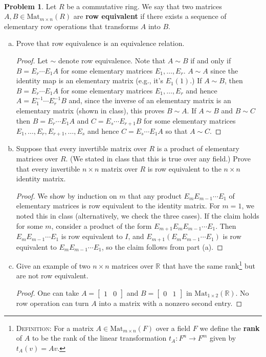 \documentclass[11pt]{article}
\theoremstyle{definition}
\newtheorem{problem}{Problem}
\begin{document}
\

\begin{problem}
Let $R$ be a commutative ring. We say that two matrices $A,B\in \mathrm{Mat}_{m\times n}(R)$ are \textbf{row equivalent} if there exists a sequence of elementary row operations that transforms $A$ into $B$. 
\begin{enumerate}[(a)]
\item Prove that row equivalence is an equivalence relation.
  \begin{proof} Let $\sim$ denote row equivalence. Note that $A \sim B$ if and only if $B = E_r \cdots E_1 A$ for some elementary matrices $E_1, \dots, E_r$.
    $A \sim A$ since the identity map is an elementary matrix (e.g., it's $E_1(1)$.) 
    If $A \sim B$, then $B = E_r \cdots E_1 A$ for some elementary matrices $E_1, \dots, E_r$ and hence $A = E_1^{-1} \cdots E_r^{-1} B$ and, since  the inverse of an elementary
    matrix is an elementary matrix (shown in class), this proves $B \sim A$. If $A \sim B$ and $B \sim C$ then
    $B = E_r \cdots E_1 A$ and $C = E_s \cdots E_{r+1} B$     for some elementary matrices $E_1, \dots, E_r, E_{r+1}, \dots, E_s$ and hence $C = E_s \cdots E_1 A$ so that $A \sim
    C$.
  \end{proof}

\item Suppose that every invertible matrix over $R$ is a product of elementary matrices over $R$. (We stated in class that this is true over any field.) Prove that every invertible $n \times n$ matrix over $R$ is row equivalent to the $n \times n$ identity matrix.

\begin{proof}
We show by induction on $m$ that any product $E_m E_{m-1} \cdots E_1$ of elementary matrices is row equivalent to the identity matrix. For $m=1$, we noted this in class (alternatively, we check the three cases). If the claim holds for some $m$, consider a product of the form $E_{m+1} E_m E_{m-1} \cdots E_1$. Then $E_m E_{m-1} \cdots E_1$ is row equivalent to $I$, and $E_{m+1} (E_m E_{m-1} \cdots E_1)$ is row equivalent to $E_m E_{m-1} \cdots E_1$, so the claim follows from part (a).
\end{proof}
\item Give an example of two $n \times n$ matrices over $\mathbb{R}$ that have the same rank\footnote{\textsc{Definition:} For a matrix $A\in \mathrm{Mat}_{m\times n}(F)$ over a field $F$ we define the \textbf{rank} of $A$ to be the rank of the linear transformation $t_A\colon F^n\to F^m$ given by $t_A(v) = Av$.} but are not row equivalent.
\begin{proof}
One can take $A=\begin{bmatrix} 1 & 0\end{bmatrix}$ and $B= \begin{bmatrix} 0 &1\end{bmatrix}$ in $\mathrm{Mat}_{1\times 2}(\mathbb{R})$. No row operation can turn $A$ into a matrix with a nonzero second entry.
\end{proof}
\end{enumerate}
\end{problem}
\end{document}
